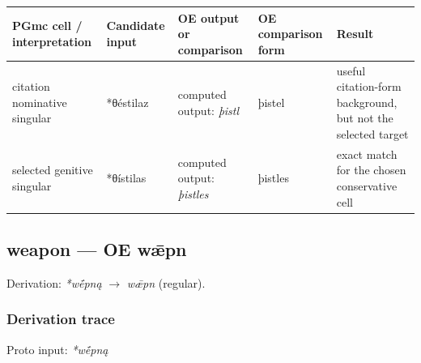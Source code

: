 \documentclass[
  british,
  a4paper,
]{article}
\newcounter{none} %
\begin{document}
{\def\LTcaptype{none} %
\begin{longtable}[]{@{}
  >{\raggedright\arraybackslash}p{}
  >{\raggedright\arraybackslash}p{}
  >{\raggedright\arraybackslash}p{}
  >{\raggedright\arraybackslash}p{}
  >{\raggedright\arraybackslash}p{}@{}}
\toprule\noalign{}
\begin{minipage}[b]{\linewidth}\raggedright
PGmc cell / interpretation
\end{minipage} & \begin{minipage}[b]{\linewidth}\raggedright
Candidate input
\end{minipage} & \begin{minipage}[b]{\linewidth}\raggedright
OE output or comparison
\end{minipage} & \begin{minipage}[b]{\linewidth}\raggedright
OE comparison form
\end{minipage} & \begin{minipage}[b]{\linewidth}\raggedright
Result
\end{minipage} \\
\midrule\noalign{}
\endhead
\bottomrule\noalign{}
\endlastfoot
citation nominative singular & *θéstilaz & computed output: \emph{þistl}
& þistel & useful citation-form background, but not the selected
target \\
selected genitive singular & *θístilas & computed output: \emph{þistles}
& þistles & exact match for the chosen conservative cell \\
\end{longtable}
}

\subsection{weapon --- OE wǣpn}\label{weapon-oe-wux1e3pn}

Derivation: \emph{*wḗpną} \(\rightarrow\) \emph{wǣpn} (regular).

\subsubsection{Derivation trace}\label{derivation-trace-5}

Proto input: \emph{*wḗpną}

\begingroup
\setlength{\fboxsep}{6pt}
\end{document}
